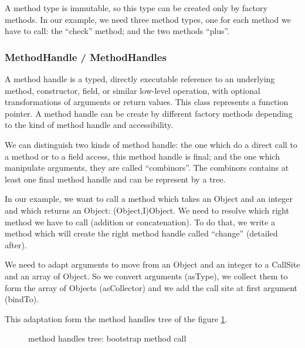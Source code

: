 \documentclass{sigplanconf}
\begin{document}
        

        A method type is immutable, so this type can be created only by factory methods.
        In our example, we need three method types, one for each method we have to call:
        the ``check'' method; and the two methods ``plus''.

        

      \subsubsection{MethodHandle / MethodHandles}
        \label{MH}
        A method handle is a typed, directly executable reference to
        an underlying method, constructor, field, or similar low-level operation,
        with optional transformations of arguments or return values.
        This class represents a function pointer.
        A method handle can be create by different factory methods depending to the kind of method handle and accessibility.

        We can distinguish two kinds of method handle:
        the one which do a direct call to a method or to a field access, this method handle is final;
        and the one which manipulate arguments, they are called ``combinors''.
        The combinors contains at least one final method handle and can be represent by a tree.

        In our example, we want to call a method which takes an Object and an integer and which returns an Object: (Object,I)Object.
        We need to resolve which right method we have to call (addition or concatenation).
        To do that, we write a method which will create the right method handle called ``change'' (detailed after).

        We need to adapt arguments to move from an Object and an integer to a CallSite and an array of Object.
        So we convert arguments (asType), we collect them to form the array of Objects (asCollector) and we add the call site at first argument (bindTo).

        

        This adaptation form the method handles tree of the figure \ref{ast1}.

        \begin{figure}[!h]
          \centering \resizebox{.6\linewidth}{!}{}
          \caption{method handles tree: bootstrap method call}
          \label{ast1}
        \end{figure}
\end{document}
